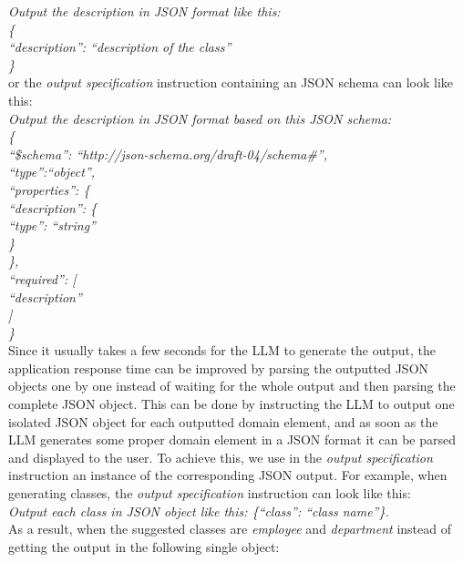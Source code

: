 \noindent{}\textit{Output the description in JSON format like this: \\
\{ \\
\null \quad ``description'': ``description of the class'' \\
\}} \\

\noindent{}or the \emph{output specification} instruction containing an JSON schema can look like this: \\

\noindent{}\textit{Output the description in JSON format based on this JSON schema: \\
\{ \\
\null \quad ``\$schema'': ``http://json-schema.org/draft-04/schema\#'', \\
\null \quad  ``type'':``object'', \\
\null \quad  ``properties'': \{ \\
\null \quad \quad ``description'': \{ \\
\null \quad \quad \quad ``type'': ``string'' \\
\null \quad \quad   \} \\
\null \quad  \}, \\
\null \quad  ``required'': [ \\
\null \quad \quad   ``description'' \\
\null \quad  ] \\
\}} \\


Since it usually takes a few seconds for the LLM to generate the output, the application response time can be improved by parsing the outputted JSON objects one by one instead of waiting for the whole output and then parsing the complete JSON object. This can be done by instructing the LLM to output one isolated JSON object for each outputted domain element, and as soon as the LLM generates some proper domain element in a JSON format it can be parsed and displayed to the user. To achieve this, we use in the \emph{output specification} instruction an instance of the corresponding JSON output. For example, when generating classes, the \emph{output specification} instruction can look like this: \\

\noindent{}\textit{Output each class in JSON object like this: \{``class'': ``class name''\}.} \\

\noindent{}As a result, when the suggested classes are \textit{employee} and \textit{department} instead of getting the output in the following single object: \\

